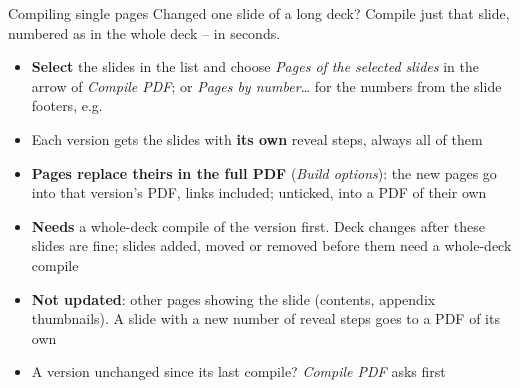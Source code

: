 
\begin{standardframe}{Compiling single pages}
	\small
	Changed one slide of a long deck? Compile just that slide, numbered as in the whole deck -- in seconds.
	\par\medskip
	\begin{itemize}
		\item \textbf{Select} the slides in the list and choose \emph{Pages of the selected slides} in the arrow of \emph{Compile PDF}; or \emph{Pages by number\ldots} for the numbers from the slide footers, e.g.\ 
		\item Each version gets the slides with \textbf{its own} reveal steps, always all of them
		\item \textbf{Pages replace theirs in the full PDF} (\emph{Build options}): the new pages go into that version's PDF, links included; unticked, into a PDF of their own
		\item \textbf{Needs} a whole-deck compile of the version first. Deck changes after these slides are fine; slides added, moved or removed before them need a whole-deck compile
		\item \textbf{Not updated}: other pages showing the slide (contents, appendix thumbnails). A slide with a new number of reveal steps goes to a PDF of its own
		\item A version unchanged since its last compile? \emph{Compile PDF} asks first
	\end{itemize}
\end{standardframe}
